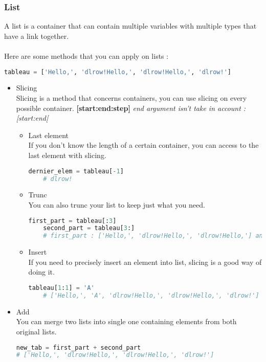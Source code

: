 \documentclass[a4paper, 12pt]{article}
\begin{document}
\subsubsection{List}
A list is a container that can contain multiple variables with multiple types that have a link together.\\ \\
Here are some methods that you can apply on lists : 

\begin{lstlisting}[language=Python]
tableau = ['Hello,', 'dlrow!Hello,', 'dlrow!Hello,', 'dlrow!']
\end{lstlisting}

\begin{itemize}
\item Slicing \\
Slicing is a method that concerns containers, you can use slicing on every possible container. \textbf{[start:end:step]} \textit{end argument isn't take in account : [start:end[}
\begin{itemize}
    \item Last element \\
    If you don't know the length of a certain container, you can access to the last element with slicing.
    \begin{lstlisting}[language=Python]
    dernier_elem = tableau[-1]
    # dlrow!
    \end{lstlisting}
    
    \item Trunc \\
    You can also trunc your list to keep just what you need.
    \begin{lstlisting}[language=Python]
    first_part = tableau[:3]
    second_part = tableau[3:]
    # first_part : ['Hello,', 'dlrow!Hello,', 'dlrow!Hello,'] and second_part : ['dlrow!']
    \end{lstlisting}
    
    \item Insert \\
    If you need to precisely insert an element into list, slicing is a good way of doing it.
    \begin{lstlisting}[language=Python]
    tableau[1:1] = 'A'
    # ['Hello,', 'A', 'dlrow!Hello,', 'dlrow!Hello,', 'dlrow!']
    \end{lstlisting}
\end{itemize}

\item Add \\
You can merge two lists into single one containing elements from both original lists.
\begin{lstlisting}[language=Python]
new_tab = first_part + second_part
# ['Hello,', 'dlrow!Hello,', 'dlrow!Hello,', 'dlrow!']
\end{lstlisting}


\end{itemize}
\end{document}
